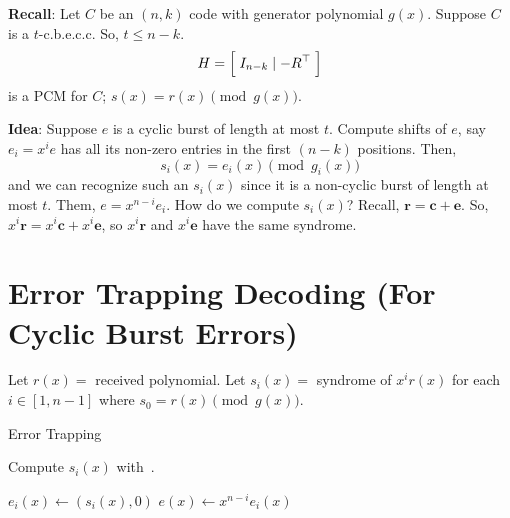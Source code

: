 \textbf{Recall}: Let $ C $ be an $ (n,k) $ code with generator polynomial
$ g(x) $. Suppose $ C $ is a $ t $-c.b.e.c.c. So, $ t\leqslant n-k $.
\[ H= \Bigl[\; I_{n-k}\mid -R^\top \;\Bigr] \]
is a PCM for $ C $; $ s(x)=r(x)\pmod{g(x)} $.

\textbf{Idea}: Suppose $ e $ is a cyclic burst of length at most $ t $.
Compute shifts of $ e $, say $ e_i=x^i e $ has all its non-zero entries in the first
$ (n-k) $ positions. Then,
\[ s_i(x)=e_i(x)\pmod{g_i(x)} \]
and we can recognize such an $ s_i(x) $ since it is a non-cyclic burst of length
at most $ t $. Them, $ e=x^{n-i}e_i $. How do we compute $ s_i(x) $? Recall,
$ \bm{r}=\bm{c}+\bm{e} $. So, $ x^i \bm{r}=x^i\bm{c}+x^i\bm{e} $, so
$ x^i \bm{r} $ and $ x^i\bm{e} $ have the same syndrome.

\section{Error Trapping Decoding (For Cyclic Burst Errors)}
Let $ r(x)= $ received polynomial. Let $ s_i(x)= $ syndrome of $ x^i r(x) $ for
each $ i\in[1,n-1] $ where $ s_0=r(x)\pmod{g(x)} $.

\begin{algbox}
    \begin{algorithm}[H]
        \DontPrintSemicolon{}
        \caption{Error Trapping}

         {
            Compute $ s_i(x) $ with~.

             {
                $ e_i(x)\gets(s_i(x),0) $\;
                $ e(x)\gets x^{n-i}e_i(x) $\;
            }
        }
        \Return{}
    \end{algorithm}
\end{algbox}


